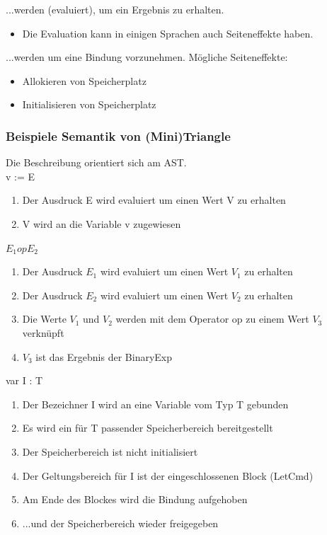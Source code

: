 \begin{defBox}[title=Ausdrücke]
	...werden (evaluiert), um ein Ergebnis zu erhalten.
	\begin{itemize}
		\item Die Evaluation kann in einigen Sprachen auch Seiteneffekte haben.
	\end{itemize}
\end{defBox}
\begin{defBox}[title=Deklarationen]
	...werden  um eine Bindung vorzunehmen. Mögliche Seiteneffekte:
	\begin{itemize}
		\item Allokieren von Speicherplatz
		\item Initialisieren von Speicherplatz
	\end{itemize}
\end{defBox}

\subsubsection*{Beispiele Semantik von (Mini)Triangle}
Die Beschreibung orientiert sich am AST.\\
 v := E
\begin{enumerate}
	\item Der Ausdruck E wird evaluiert um einen Wert V zu erhalten
	\item V wird an die Variable v zugewiesen 
\end{enumerate}
 $E_1 op E_2$
\begin{enumerate}
	\item Der Ausdruck $E_1$ wird evaluiert um einen Wert $V_1$ zu erhalten
	\item Der Ausdruck $E_2$ wird evaluiert um einen Wert $V_2$ zu erhalten
	\item Die Werte $V_1$ und $V_2$ werden mit dem Operator op zu einem Wert $V_3$ verknüpft
	\item $V_3$ ist das Ergebnis der BinaryExp
\end{enumerate}
 var I : T
\begin{enumerate}
	\item Der Bezeichner I wird an eine Variable vom Typ T gebunden
	\item Es wird ein für T passender Speicherbereich bereitgestellt
	\item Der Speicherbereich ist nicht initialisiert
	\item Der Geltungsbereich für I ist der eingeschlossenen Block (LetCmd)
	\item Am Ende des Blockes wird die Bindung aufgehoben
	\item ...und der Speicherbereich wieder freigegeben
\end{enumerate}


